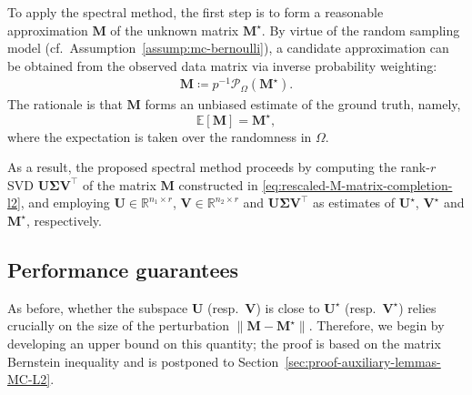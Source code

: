To apply the spectral method, the first step is to form a reasonable approximation $\bm{M}$ of the unknown matrix $\bm{M}^{\star}$.
By virtue of the random sampling model (cf.~Assumption~\ref{assump:mc-bernoulli}), a candidate approximation can be obtained from the observed data matrix via inverse probability weighting:
%
\begin{align}
	\bm{M}   \coloneqq p^{-1}\mathcal{P}_{\Omega}(\bm{M}^{\star}).
	\label{eq:rescaled-M-matrix-completion-l2}
\end{align}
%
The rationale is that $\bm{M}$ forms an unbiased estimate of the ground truth, namely, $$\mathbb{E}[\bm{M}]=\bm{M}^{\star},$$ where
the expectation is taken over the randomness in $\Omega$.


As a result, the proposed spectral method proceeds by computing the rank-$r$ SVD $\bm{U}\bm{\Sigma}\bm{V}^{\top}$ of the matrix $\bm{M}$ constructed in \eqref{eq:rescaled-M-matrix-completion-l2}, and employing $\bm{U}\in \mathbb{R}^{n_1\times r}$, $\bm{V}\in \mathbb{R}^{n_2\times r}$  and $\bm{U}\bm{\Sigma}\bm{V}^{\top}$ as estimates of $\bm{U}^{\star}$, $\bm{V}^{\star}$ and $\bm{M}^{\star}$, respectively.






\subsection{Performance guarantees}\label{sec:mc-l2-theory}

As before, whether the subspace $\bm{U}$ (resp.~$\bm{V}$) is close
to $\bm{U}^{\star}$ (resp.~$\bm{V}^{\star}$) relies crucially on
the size of the perturbation $\|\bm{M}-\bm{M}^{\star}\|$.
Therefore, we begin by developing an upper bound on this quantity; the proof is based on the matrix Bernstein inequality and is postponed to Section~\ref{sec:proof-auxiliary-lemmas-MC-L2}.


